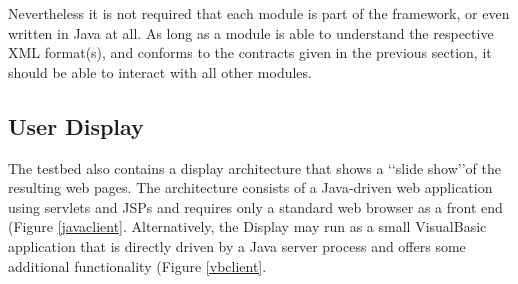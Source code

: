 \documentclass[a4paper]{danarticle}
\theoremstyle{remark}
\begin{document}
      Nevertheless it is not required that each module is part of the 
      framework, or even written in Java at all. As long as a module is able to 
      understand the respective XML format(s), and conforms to the contracts 
      given in the previous section, it should be able to interact with all 
      other modules.
    \subsection{User Display}
      The testbed also contains a display architecture that shows a \lq\lq slide
      show\rq\rq of the resulting web pages. The architecture consists of a
      Java-driven web application using servlets and JSPs and requires only a
      standard web browser as a front end (Figure \ref{javaclient}. 
      Alternatively, the Display may run as
      a small VisualBasic application that is directly driven by a Java server
      process and offers some additional functionality (Figure \ref{vbclient}.
      
\end{document}
